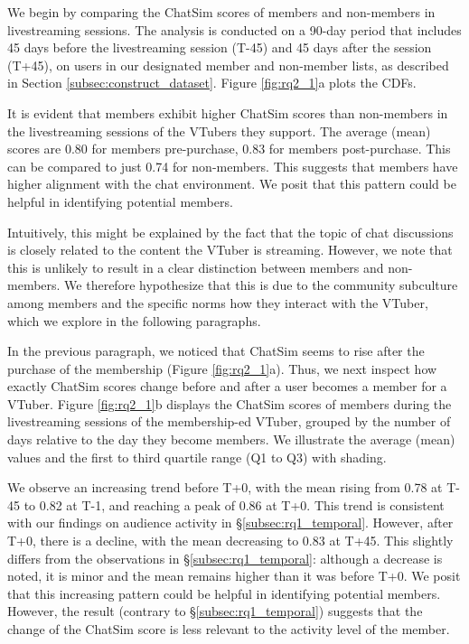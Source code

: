 We begin by comparing the ChatSim scores of members and non-members in livestreaming sessions. 
The analysis is conducted on a 90-day period that includes 45 days before the livestreaming session (T-45) and 45 days after the session (T+45), on users in our designated member and non-member lists, as described in Section \ref{subsec:construct_dataset}. Figure \ref{fig:rq2_1}a plots the CDFs.

It is evident that members exhibit higher ChatSim scores than non-members in the livestreaming sessions of the VTubers they support. The average (mean) scores are 0.80 for members pre-purchase, 0.83 for members post-purchase.
This can be compared to just 0.74 for non-members. 
% 
This suggests that members have higher alignment with the chat environment. We posit that this pattern could be helpful in identifying potential members.

Intuitively, this might be explained by the fact that the topic of chat discussions is closely related to the content the VTuber is streaming. However, we note that this is unlikely to result in a clear distinction between members and non-members. We therefore hypothesize that this is due to the community subculture among members and the specific norms how they interact with the VTuber, which we explore in the following paragraphs.


In the previous paragraph, we noticed that ChatSim seems to rise after the purchase of the membership (Figure \ref{fig:rq2_1}a).
Thus, we next inspect how exactly ChatSim scores change before and after a user becomes a member for a VTuber. 
Figure \ref{fig:rq2_1}b displays the ChatSim scores of members during the livestreaming sessions of the membership-ed VTuber, grouped by the number of days relative to the day they become members. We illustrate the average (mean) values and the first to third quartile range (Q1 to Q3) with shading.

We observe an increasing trend before T+0, with the mean rising from 0.78 at T-45 to 0.82 at T-1, and reaching a peak of 0.86 at T+0. This trend is consistent with our findings on audience activity in  \S\ref{subsec:rq1_temporal}. However, after T+0, there is a decline, with the mean decreasing to 0.83 at T+45. This slightly differs from the observations in  \S\ref{subsec:rq1_temporal}: although a decrease is noted, it is minor and the mean remains higher than it was before T+0.
We posit that this increasing pattern could be helpful in identifying potential members. 
However, the result (contrary to \S\ref{subsec:rq1_temporal}) suggests that the change of the ChatSim score is less relevant to the activity level of the member. 


